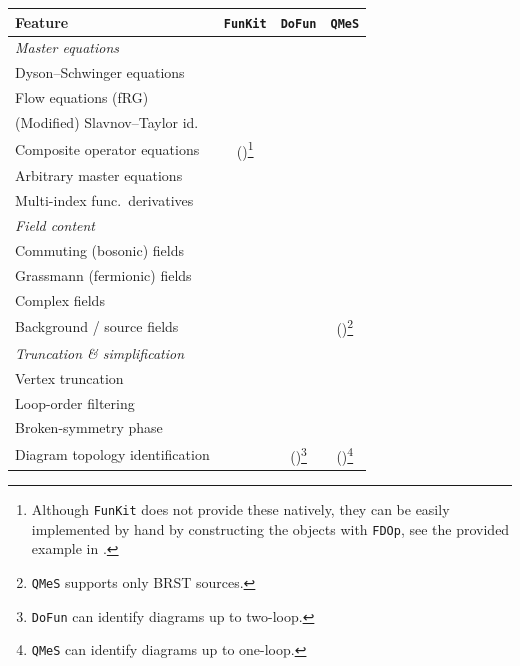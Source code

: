 \documentclass[preprint,10pt,sort&compress]{elsarticle}
\newcommand{\cmark}{\ding{51}}
\newcommand{\xmark}{\ding{55}}
\newcommand{\FunKit}{\texttt{FunKit}\xspace}
\newcommand{\QMeS}{\texttt{QMeS}\xspace}
\newcommand{\DoFun}{\texttt{DoFun}\xspace}
\begin{document}
\begin{table}[t]
	\centering
	\renewcommand{\arraystretch}{1.25}
	\renewcommand*\footnoterule{}
	\begin{minipage}{1\linewidth}
		\small
		\hspace{-0.5cm}
		\begin{tabular}[t]{l c c c |}
			\toprule
			\textbf{Feature} & \FunKit & \DoFun & \QMeS \\
			\midrule
			\multicolumn{3}{l}{\textit{Master equations}} &\\
			\quad Dyson--Schwinger equations             & \cmark  & \cmark  & \cmark \\
			\quad Flow equations (fRG)                  & \cmark  & \cmark  & \cmark \\
			\quad (Modified) Slavnov--Taylor id.         & \cmark  & \xmark  & \cmark \\
			\quad Composite operator equations          & (\cmark)\footnote{Although \FunKit does not provide these natively, they can be easily implemented by hand by constructing the objects with \texttt{FDOp}, see the provided example in \Cref{tab:examples}.}  & \cmark  & \xmark \\
			\quad Arbitrary master equations            & \cmark  & \xmark  & \xmark \\
			\quad Multi-index func.\ derivatives        & \cmark  & \xmark  & \xmark \\
			\hline
			\multicolumn{3}{l}{\textit{Field content}} &\\
			\quad Commuting (bosonic) fields            & \cmark  & \cmark  & \cmark \\
			\quad Grassmann (fermionic) fields          & \cmark  & \cmark  & \cmark \\
			\quad Complex fields                        & \cmark  & \cmark  & \cmark \\
			\quad Background / source fields            & \cmark  & \xmark  & (\cmark)\footnote{\QMeS supports only BRST sources.} \\
			\hline
			\multicolumn{3}{l}{\textit{Truncation \& simplification}} & \\
			\quad Vertex truncation                     & \cmark  & \cmark  & \cmark \\
			\quad Loop-order filtering                  & \cmark  & \cmark  & \xmark \\
			\quad Broken-symmetry phase                 & \cmark  & \cmark  & \xmark \\
			\quad Diagram topology identification       & \cmark  & (\cmark)\footnote{\DoFun can identify diagrams up to two-loop.}  & (\cmark)\footnote{\QMeS can identify diagrams up to one-loop.} \\

\end{tabular}
\end{minipage}
\end{table}
\end{document}
